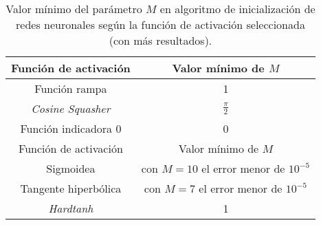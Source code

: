 \begin{table}[H]
    \centering
    \begin{tabular}{|c|c|}
    \hline
        Función de activación  & Valor mínimo de $M$ \\ \hline
        Función rampa & 1 \\ \hline
        \textit{Cosine Squasher} & $\frac{\pi}{2}$ \\ \hline
        Función indicadora 0 & 0 \\ \hline
        Función de activación  & Valor mínimo de $M$ \\ \hline
        Sigmoidea  & con $M=10$ el error menor de $10^{-5}$\\ \hline
        Tangente hiperbólica  &  con $M=7$ el error menor de $10^{-5}$\\ \hline
        \textit{Hardtanh} & 1 \\ \hline
    \end{tabular}
    \caption{Valor mínimo del parámetro $M$ en algoritmo de inicialización de redes neuronales según la función de activación seleccionada (con más resultados).}
    \label{table:M-activation-function-2}
\end{table}

